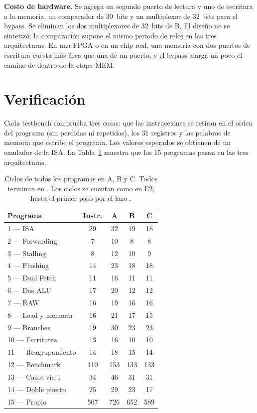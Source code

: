 \documentclass[11pt,a4paper]{article}
\newcommand{\sig}[1]{\texttt{\detokenize{#1}}}
\begin{document}
\textbf{Costo de hardware.} Se agrega un segundo puerto de lectura y uno de escritura a la memoria, un comparador de 30~bits y un multiplexor de 32~bits para el bypass. Se eliminan los dos multiplexores de 32~bits de B. El diseño no se sintetizó; la comparación supone el mismo periodo de reloj en las tres arquitecturas. En una FPGA o en un chip real, una memoria con dos puertos de escritura cuesta más área que una de un puerto, y el bypass alarga un poco el camino de \sig{rd1} dentro de la etapa MEM.

\section{Verificación}

Cada testbench comprueba tres cosas: que las instrucciones se retiran en el orden del programa (sin perdidas ni repetidas), los 31 registros y las palabras de memoria que escribe el programa. Los valores esperados se obtienen de un emulador de la ISA. La Tabla~\ref{tab:ef-regresion} muestra que los 15 programas pasan en las tres arquitecturas.

\begin{table}[htbp]
\centering
\caption{Ciclos de todos los programas en A, B y C. Todos terminan en \sig{PASS}. Los ciclos se cuentan como en E2, hasta el primer paso por el lazo \sig{fin}.}
\label{tab:ef-regresion}
\begin{tabular}{l c c c c}
\toprule
\textbf{Programa} & \textbf{Instr.} & \textbf{A} & \textbf{B} & \textbf{C} \\
\midrule
1 --- ISA & 29 & 32 & 19 & 18 \\
2 --- Forwarding & 7 & 10 & 8 & 8 \\
3 --- Stalling & 8 & 12 & 10 & 9 \\
4 --- Flushing & 14 & 23 & 18 & 18 \\
5 --- Dual Fetch & 11 & 16 & 11 & 11 \\
6 --- Dos ALU & 17 & 20 & 12 & 12 \\
7 --- RAW & 16 & 19 & 16 & 16 \\
8 --- Load y memoria & 16 & 21 & 17 & 15 \\
9 --- Branches & 19 & 30 & 23 & 23 \\
10 --- Escrituras & 13 & 16 & 10 & 10 \\
11 --- Reagrupamiento & 14 & 18 & 15 & 14 \\
12 --- Benchmark & 110 & 153 & 133 & 133 \\
13 --- Casos vía 1 & 34 & 46 & 31 & 31 \\
14 --- Doble puerto & 25 & 29 & 23 & 17 \\
15 --- Propio & 507 & 726 & 652 & 589 \\
\bottomrule
\end{tabular}
\end{table}
\end{document}
